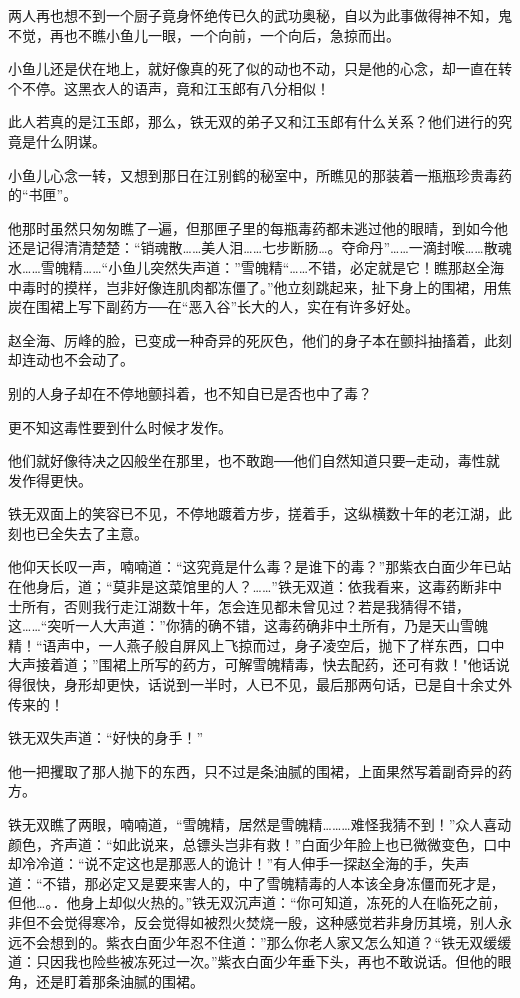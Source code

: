 \documentclass[12pt,oneside]{book}
\begin{document}
两人再也想不到一个厨子竟身怀绝传已久的武功奥秘，自以为此事做得神不知，鬼不觉，再也不瞧小鱼儿一眼，一个向前，一个向后，急掠而出。

小鱼儿还是伏在地上，就好像真的死了似的动也不动，只是他的心念，却一直在转个不停。这黑衣人的语声，竟和江玉郎有八分相似！

此人若真的是江玉郎，那么，铁无双的弟子又和江玉郎有什么关系？他们进行的究竟是什么阴谋。

小鱼儿心念一转，又想到那日在江别鹤的秘室中，所瞧见的那装着一瓶瓶珍贵毒药的``书匣''。

他那时虽然只匆匆瞧了─遍，但那匣子里的每瓶毒药都未逃过他的眼晴，到如今他还是记得清清楚楚：``销魂散\ldots\ldots 美人泪\ldots\ldots 七步断肠\ldots。夺命丹''\ldots\ldots 一滴封喉\ldots\ldots 散魂水\ldots\ldots 雪魄精\ldots\ldots{}``小鱼儿突然失声道：''雪魄精``\ldots\ldots 不错，必定就是它！瞧那赵全海中毒时的摸样，岂非好像连肌肉都冻僵了。''他立刻跳起来，扯下身上的围裙，用焦炭在围裙上写下副药方──在``恶入谷''长大的人，实在有许多好处。

赵全海、厉峰的脸，已变成一种奇异的死灰色，他们的身子本在颤抖抽搐着，此刻却连动也不会动了。

别的人身子却在不停地颤抖着，也不知自已是否也中了毒？

更不知这毒性要到什么时候才发作。

他们就好像待决之囚般坐在那里，也不敢跑──他们自然知道只要─走动，毒性就发作得更快。

铁无双面上的笑容已不见，不停地踱着方步，搓着手，这纵横数十年的老江湖，此刻也已全失去了主意。

他仰天长叹一声，喃喃道：``这究竟是什么毒？是谁下的毒？''那紫衣白面少年已站在他身后，道；``莫非是这菜馆里的人？\ldots\ldots{}''铁无双道：依我看来，这毒药断非中士所有，否则我行走江湖数十年，怎会连见都未曾见过？若是我猜得不错，这\ldots\ldots{}``突听一人大声道：''你猜的确不错，这毒药确非中土所有，乃是天山雪魄精！``语声中，一人燕子般自屏风上飞掠而过，身子凌空后，抛下了样东西，口中大声接着道；''围裙上所写的药方，可解雪魄精毒，快去配药，还可有救！"他话说得很快，身形却更快，话说到一半时，人已不见，最后那两句话，已是自十余丈外传来的！

铁无双失声道：``好快的身手！''

他一把攫取了那人抛下的东西，只不过是条油腻的围裙，上面果然写着副奇异的药方。

铁无双瞧了两眼，喃喃道，``雪魄精，居然是雪魄精\ldots\ldots\ldots 难怪我猜不到！''众人喜动颜色，齐声道：``如此说来，总镖头岂非有救！''白面少年脸上也已微微变色，口中却冷冷道：``说不定这也是那恶人的诡计！''有人伸手一探赵全海的手，失声道：``不错，那必定又是要来害人的，中了雪魄精毒的人本该全身冻僵而死才是，但他\ldots。．他身上却似火热的。''铁无双沉声道：``你可知道，冻死的人在临死之前，非但不会觉得寒冷，反会觉得如被烈火焚烧一殷，这种感觉若非身历其境，别人永远不会想到的。紫衣白面少年忍不住道：''那么你老人家又怎么知道？``铁无双缓缓道：只因我也险些被冻死过一次。''紫衣白面少年垂下头，再也不敢说话。但他的眼角，还是盯着那条油腻的围裙。
\end{document}
